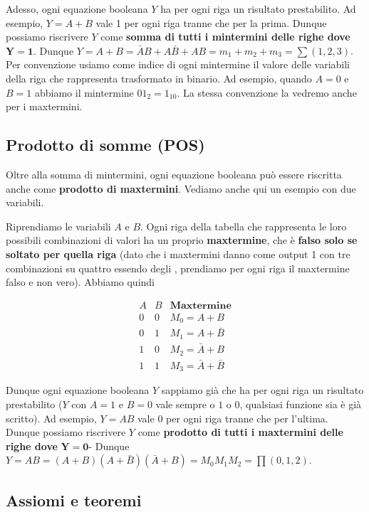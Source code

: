 \documentclass[11pt, a4paper, titlepage, oneside]{scrbook}
\begin{document}
Adesso, ogni equazione booleana $Y$ ha per ogni riga un risultato prestabilito. Ad esempio, $Y = A + B$ vale 1 per ogni riga tranne che per la prima. Dunque possiamo riscrivere $Y$ come \textbf{somma di tutti i mintermini delle righe dove} $\bm{Y = 1}$. Dunque \mbox{$Y = A + B = \bar{A} B + A \bar{B} + AB = m_1 + m_2 + m_3 = \sum(1,2,3)$}. \\
\NB Per convenzione usiamo come indice di ogni mintermine il valore delle variabili della riga che rappresenta trasformato in binario. Ad esempio, quando $A = 0$ e $B = 1$ abbiamo il mintermine $01_2 = 1_{10}$. La stessa convenzione la vedremo anche per i maxtermini.

\subsection{Prodotto di somme (POS)}

Oltre alla somma di mintermini, ogni equazione booleana può essere riscritta anche come \textbf{prodotto di maxtermini}. Vediamo anche qui un esempio con due variabili.

Riprendiamo le variabili $A$ e $B$. Ogni riga della tabella che rappresenta le loro possibili combinazioni di valori ha un proprio \textbf{maxtermine}, che è \textbf{falso solo se soltato per quella riga} (dato che i maxtermini danno come output 1 con tre combinazioni su quattro essendo degli , prendiamo per ogni riga il maxtermine falso e non vero). Abbiamo quindi

\[
\begin{array}{cc|c}
A & B & \textbf{Maxtermine} \\
\hline
0 & 0 & M_0 = A + B \\
0 & 1 & M_1 = A + \bar{B} \\
1 & 0 & M_2 = \bar{A} + B \\
1 & 1 & M_3 = \bar{A} + \bar{B}
\end{array}
\]

Dunque ogni equazione booleana $Y$ sappiamo già che ha per ogni riga un risultato prestabilito ($Y$ con $A = 1$ e $B = 0$ vale sempre o $1$ o $0$, qualsiasi funzione sia è già scritto). Ad esempio, $Y = AB$ vale 0 per ogni riga tranne che per l'ultima. Dunque possiamo riscrivere $Y$ come \textbf{prodotto di tutti i maxtermini delle righe dove} $\bm{Y = 0}$- Dunque \mbox{$Y = AB = (A + B) (A + \bar{B}) (\bar{A} + B) = M_0 M_1 M_2 = \prod(0,1,2)$}.

\subsection{Assiomi e teoremi}
\end{document}
